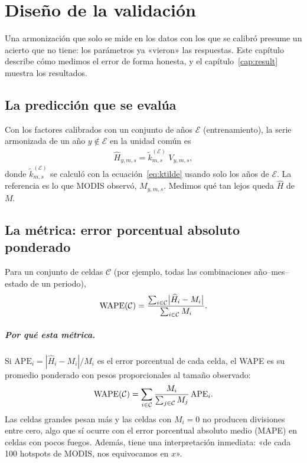 \chapter{Diseño de la validación}\label{cap:valid}

Una armonización que solo se mide en los datos con los que se calibró presume un acierto que no tiene: los parámetros ya «vieron» las respuestas. Este capítulo describe cómo medimos el error de forma honesta, y el capítulo~\ref{cap:result} muestra los resultados.

\section{La predicción que se evalúa}

Con los factores calibrados con un conjunto de años $\mathcal{E}$ (entrenamiento), la serie armonizada de un año $y\notin\mathcal{E}$ en la unidad común es
\begin{align*}
  \widehat H_{y,m,s}=\widetilde k_{m,s}^{(\mathcal{E})}\;V_{y,m,s},
\end{align*}
donde $\widetilde k^{(\mathcal{E})}_{m,s}$ se calculó con la ecuación~\eqref{eq:ktilde} usando solo los años de $\mathcal{E}$. La referencia es lo que MODIS observó, $M_{y,m,s}$. Medimos qué tan lejos queda $\widehat H$ de $M$.

\section{La métrica: error porcentual absoluto ponderado}\label{sec:wape}

\begin{definicion}[WAPE]
Para un conjunto de celdas $\mathcal{C}$ (por ejemplo, todas las combinaciones año--mes--estado de un periodo),
\begin{align*}
  \operatorname{WAPE}(\mathcal{C})=\frac{\sum_{i\in\mathcal{C}}\bigl|\widehat H_i-M_i\bigr|}{\sum_{i\in\mathcal{C}}M_i}.
\end{align*}
\end{definicion}

\paragraph{Por qué esta métrica.} Si $\mathrm{APE}_i=|\widehat H_i-M_i|/M_i$ es el error porcentual de cada celda, el WAPE es su promedio ponderado con pesos proporcionales al tamaño observado:
\begin{align*}
  \operatorname{WAPE}(\mathcal{C})=\sum_{i\in\mathcal{C}}\frac{M_i}{\sum_{j\in\mathcal{C}}M_j}\,\mathrm{APE}_i.
\end{align*}
Las celdas grandes pesan más y las celdas con $M_i=0$ no producen divisiones entre cero, algo que sí ocurre con el error porcentual absoluto medio (MAPE) en celdas con pocos fuegos. Además, tiene una interpretación inmediata: «de cada 100 hotspots de MODIS, nos equivocamos en $x$».

